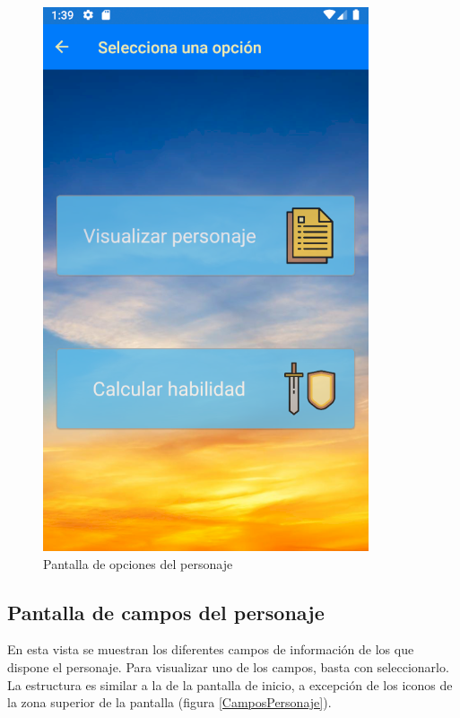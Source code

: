 \begin{figure}[H]
    \centering
    \includegraphics[scale=0.3]{Figures/Capturas/OpcionesPersonaje.png}
    \caption{Pantalla de opciones del personaje}
    \label{OpcionesPersonaje}    
\end{figure}

\subsection{Pantalla de campos del personaje}
En esta vista se muestran los diferentes campos de información de los que dispone el personaje.
Para visualizar uno de los campos, basta con seleccionarlo. La estructura es similar a la de la 
pantalla de inicio, a excepción de los iconos de la zona superior de la pantalla (figura \ref*{CamposPersonaje}).

